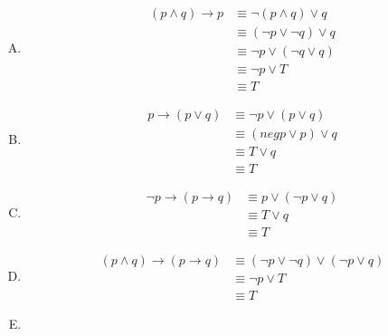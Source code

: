{{        %
        \begin{practices}
            \begin{enumerate}[A.]
                \item
                {
                    \begin{align*}
                        (p \wedge q) \rightarrow p
                        &\equiv \neg (p \wedge q) \vee q \\
                        &\equiv (\neg p \vee \neg q) \vee q \\
                        &\equiv \neg p \vee (\neg q \vee q) \\
                        &\equiv \neg p \vee T \\
                        &\equiv T
                    \end{align*}
                }
                \item
                {
                    \begin{align*}
                        p \rightarrow (p \vee q)
                        &\equiv \neg p \vee (p \vee q) \\
                        &\equiv (neg p \vee p) \vee q \\
                        &\equiv T \vee q \\
                        &\equiv T
                    \end{align*}
                }
                \item
                {
                    \begin{align*}
                        \neg p \rightarrow (p \rightarrow q)
                        &\equiv p \vee (\neg p \vee q) \\
                        &\equiv T \vee q \\
                        &\equiv T
                    \end{align*}
                }
                \item
                {
                    \begin{align*}
                        (p \wedge q) \rightarrow (p \rightarrow q)
                        &\equiv (\neg p \vee \neg q) \vee (\neg p \vee q) \\
                        &\equiv \neg p \vee T \\
                        &\equiv T
                    \end{align*}
                }
                \item

\end{enumerate}
\end{practices}}}
